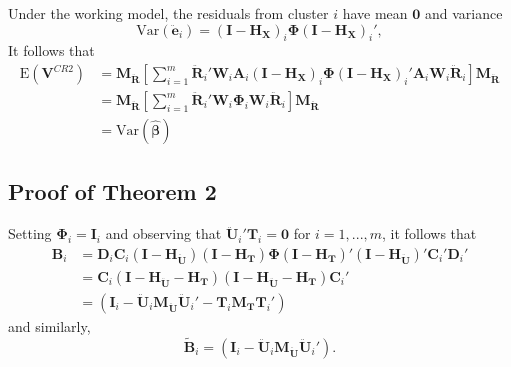 \documentclass[12pt]{article}
\begin{document}
Under the working model, the residuals from cluster \(i\) have mean
\(\mathbf{0}\) and variance \[
\text{Var}\left(\mathbf{\ddot{e}}_i\right) = \left(\mathbf{I} - \mathbf{H_X}\right)_i \boldsymbol\Phi \left(\mathbf{I} - \mathbf{H_X}\right)_i',\]
It follows that \begin{align*}
\text{E}\left(\mathbf{V}^{CR2}\right) &= \mathbf{M_{\ddot{R}}}\left[\sum_{i=1}^m \mathbf{\ddot{R}}_i' \mathbf{W}_i \mathbf{A}_i \left(\mathbf{I} - \mathbf{H_X}\right)_i \boldsymbol\Phi \left(\mathbf{I} - \mathbf{H_X}\right)_i' \mathbf{A}_i \mathbf{W}_i \mathbf{\ddot{R}}_i \right] \mathbf{M_{\ddot{R}}} \\
&= \mathbf{M_{\ddot{R}}}\left[\sum_{i=1}^m \mathbf{\ddot{R}}_i' \mathbf{W}_i \boldsymbol\Phi_i \mathbf{W}_i \mathbf{\ddot{R}}_i \right] \mathbf{M_{\ddot{R}}} \\
&= \text{Var}\left(\boldsymbol{\hat\beta}\right)
\end{align*}

\hypertarget{proof-of-theorem-2}{%
\subsection{Proof of Theorem 2}\label{proof-of-theorem-2}}

Setting \(\boldsymbol\Phi_i = \mathbf{I}_i\) and observing that
\(\mathbf{\ddot{U}}_i'\mathbf{T}_i = \mathbf{0}\) for \(i = 1,...,m\),
it follows that \begin{align}
\mathbf{B}_i &= \mathbf{D}_i \mathbf{C}_i \left(\mathbf{I} - \mathbf{H_{\ddot{U}}}\right) \left(\mathbf{I} - \mathbf{H_T}\right) \boldsymbol\Phi \left(\mathbf{I} - \mathbf{H_T}\right)' \left(\mathbf{I} - \mathbf{H_{\ddot{U}}}\right)' \mathbf{C}_i' \mathbf{D}_i' \nonumber \\ 
&= \mathbf{C}_i \left(\mathbf{I} - \mathbf{H_{\ddot{U}}} - \mathbf{H_T}\right) \left(\mathbf{I} - \mathbf{H_{\ddot{U}}} - \mathbf{H_T}\right) \mathbf{C}_i' \nonumber\\ 
\label{eq:B_i}
&= \left(\mathbf{I}_i - \mathbf{\ddot{U}}_i \mathbf{M_{\ddot{U}}}\mathbf{\ddot{U}}_i' - \mathbf{T}_i \mathbf{M_T}\mathbf{T}_i'\right)
\end{align} and similarly, \begin{equation}
\label{eq:Btilde_i}
\tilde{\mathbf{B}}_i = \left(\mathbf{I}_i - \mathbf{\ddot{U}}_i \mathbf{M_{\ddot{U}}}\mathbf{\ddot{U}}_i'\right).
\end{equation}
\end{document}
